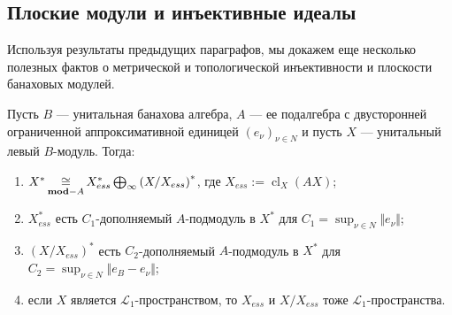 
\subsection{
    Плоские модули и инъективные идеалы
}\label{
    SubSectionFlatModulesAndInjectiveIdeals
}

Используя результаты предыдущих параграфов, мы докажем еще несколько полезных
фактов о метрической и топологической инъективности и плоскости банаховых
модулей.

\begin{proposition}\label{DualBanModDecomp} Пусть $B$ --- унитальная банахова
алгебра, $A$ --- ее подалгебра с двусторонней ограниченной аппроксимативной
единицей ${(e_\nu)}_{\nu\in N}$ и пусть $X$ --- унитальный левый $B$-модуль.
Тогда:
\begin{enumerate}[label = (\roman*)]
    \item $X^*\mathop{\mathbin{\cong}}\limits_{\mathbf{mod}-A}X_{ess}^*\bigoplus_\infty {(X/X_{ess})}^*$,
    где $X_{ess}:=\operatorname{cl}_X(AX)$;

    \item $X_{ess}^*$ есть $C_1$-дополняемый $A$-подмодуль в $X^*$ для
    $C_1=\sup_{\nu\in N}\Vert e_\nu\Vert$;

    \item ${(X/X_{ess})}^*$ есть $C_2$-дополняемый $A$-подмодуль в $X^*$ для
    $C_2=\sup_{\nu\in N}\Vert e_B - e_\nu\Vert$;

    \item если $X$ является $\mathscr{L}_1$-пространством, то $X_{ess}$ и
    $X/X_{ess}$ тоже $\mathscr{L}_1$-пространства.
\end{enumerate}
\end{proposition}
